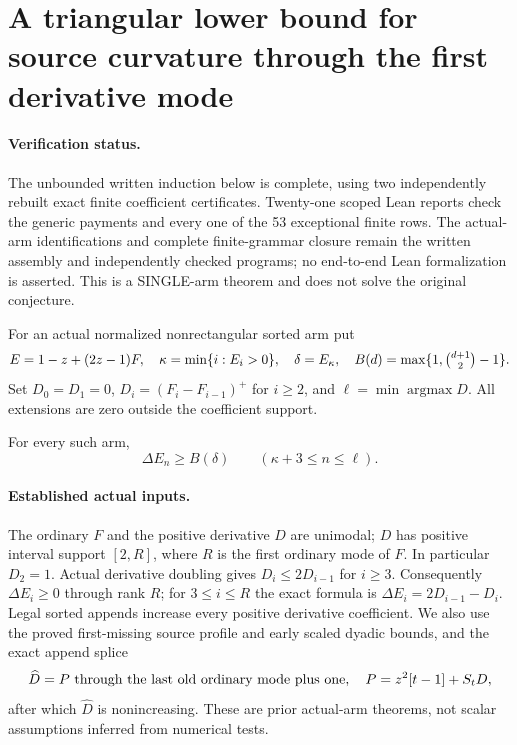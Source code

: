 \section{A triangular lower bound for source curvature through the first derivative mode}
\paragraph{Verification status.}
The unbounded written induction below is complete, using two independently
rebuilt exact finite coefficient certificates. Twenty-one scoped Lean reports
check the generic payments and every one of the 53 exceptional finite rows.
The actual-arm identifications and complete finite-grammar closure remain
the written assembly and independently checked programs; no end-to-end
Lean formalization is asserted. This is a SINGLE-arm theorem and does not
solve the original conjecture.

For an actual normalized nonrectangular sorted arm put
\[
 E=1-z+(2z-1)F,\quad \kappa=\min\{i:E_i>0\},
 \quad\delta=E_\kappa,\quad B(d)=\max\{1,\tbinom{d+1}{2}-1\}.
\]
Set $D_0=D_1=0$, $D_i=(F_i-F_{i-1})^+$ for $i\ge2$, and
$\ell=\min\operatorname{argmax}D$. All extensions are zero outside
the coefficient support.

\begin{theorem}
For every such arm,
\[
                      \Delta E_n\ge B(\delta)
                             \qquad(\kappa+3\le n\le\ell). \tag{TC}
\]
\end{theorem}

\paragraph{Established actual inputs.}
The ordinary $F$ and the positive derivative $D$ are unimodal;
$D$ has positive interval support $[2,R]$, where $R$ is the first
ordinary mode of $F$. In particular $D_2=1$.
Actual derivative doubling gives $D_i\le2D_{i-1}$ for $i\ge3$.
Consequently $\Delta E_i\ge0$ through rank $R$; for $3\le i\le R$
the exact formula is $\Delta E_i=2D_{i-1}-D_i$.
Legal sorted appends increase every positive derivative coefficient.
We also use the proved first-missing source profile and early scaled
dyadic bounds, and the exact append splice
\[
 \widehat D=P\ \hbox{through the last old ordinary mode plus one},
 \quad P=z^2[t-1]+S_tD,
\]
after which $\widehat D$ is nonincreasing. These are prior actual-arm
theorems, not scalar assumptions inferred from numerical tests.

